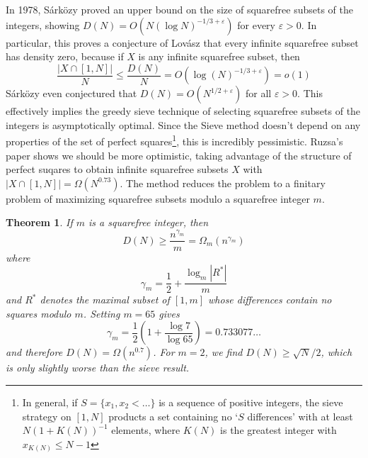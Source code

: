 \documentclass{report}
\theoremstyle{plain}
\theoremstyle{plain}
\newtheorem{theorem}{Theorem}
\begin{document}
In 1978, S\'{a}rk\"{o}zy proved an upper bound on the size of squarefree subsets of the integers, showing $D(N) = O(N (\log N)^{-1/3 + \varepsilon})$ for every $\varepsilon > 0$. In particular, this proves a conjecture of Lov\'{a}sz that every infinite squarefree subset has density zero, because if $X$ is any infinite squarefree subset, then
%
\[ \frac{|X \cap [1,N]|}{N} \leq \frac{D(N)}{N} = O(\log(N)^{-1/3 + \varepsilon}) = o(1) \]
%
S\'{a}rk\"{o}zy even conjectured that $D(N) = O(N^{1/2 + \varepsilon})$ for all $\varepsilon > 0$. This effectively implies the greedy sieve technique of selecting squarefree subsets of the integers is asymptotically optimal. Since the Sieve method doesn't depend on any properties of the set of perfect squares\footnote{In general, if $S = \{ x_1 , x_2 < \dots \}$ is a sequence of positive integers, the sieve strategy on $[1,N]$ products a set containing no `$S$ differences' with at least $N(1 + K(N))^{-1}$ elements, where $K(N)$ is the greatest integer with $x_{K(N)} \leq N-1$}, this is incredibly pessimistic. Ruzsa's paper shows we should be more optimistic, taking advantage of the structure of perfect suqares to obtain infinite squarefree subsets $X$ with $|X \cap [1,N]| = \Omega(N^{0.73})$. The method reduces the problem to a finitary problem of maximizing squarefree subsets modulo a squarefree integer $m$.

\begin{theorem}
    If $m$ is a squarefree integer, then
    \[ D(N) \geq \frac{n^{\gamma_m}}{m} = \Omega_m(n^{\gamma_m}) \]
    where
    \[ \gamma_m = \frac{1}{2} + \frac{\log_m |R^*|}{m} \]
    and $R^*$ denotes the maximal subset of $[1,m]$ whose differences contain no squares modulo $m$. Setting $m = 65$ gives
    \[ \gamma_m = \frac{1}{2} \left( 1 + \frac{\log 7}{\log 65} \right) = 0.733077 \dots \]
    and therefore $D(N) = \Omega(n^{0.7})$. For $m = 2$, we find $D(N) \geq \sqrt{N}/2$, which is only slightly worse than the sieve result.
\end{theorem}
\end{document}
